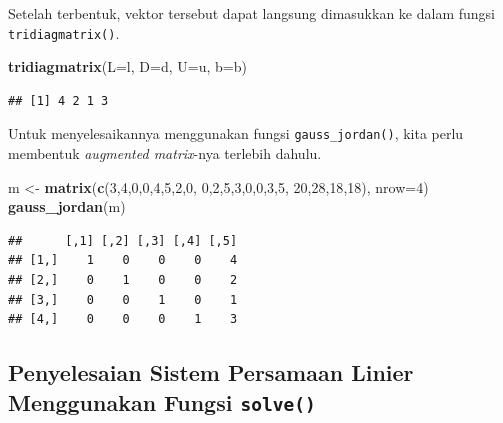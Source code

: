 \documentclass[
]{book}
\newenvironment{Shaded}{\begin{snugshade}}{\end{snugshade}}
\newcommand{\AttributeTok}[1]{\textcolor[rgb]{0.13,0.29,0.53}{#1}}
\newcommand{\DecValTok}[1]{\textcolor[rgb]{0.00,0.00,0.81}{#1}}
\newcommand{\FunctionTok}[1]{\textcolor[rgb]{0.13,0.29,0.53}{\textbf{#1}}}
\newcommand{\NormalTok}[1]{#1}
\newcommand{\OtherTok}[1]{\textcolor[rgb]{0.56,0.35,0.01}{#1}}
\theoremstyle{definition}
\theoremstyle{definition}
\theoremstyle{definition}
\theoremstyle{definition}
\theoremstyle{remark}
\begin{document}
Setelah terbentuk, vektor tersebut dapat langsung dimasukkan ke dalam fungsi \texttt{tridiagmatrix()}.

\begin{Shaded}
\begin{Highlighting}[]
\FunctionTok{tridiagmatrix}\NormalTok{(}\AttributeTok{L=}\NormalTok{l, }\AttributeTok{D=}\NormalTok{d, }\AttributeTok{U=}\NormalTok{u, }\AttributeTok{b=}\NormalTok{b)}
\end{Highlighting}
\end{Shaded}

\begin{verbatim}
## [1] 4 2 1 3
\end{verbatim}

Untuk menyelesaikannya menggunakan fungsi \texttt{gauss\_jordan()}, kita perlu membentuk \emph{augmented matrix}-nya terlebih dahulu.

\begin{Shaded}
\begin{Highlighting}[]
\NormalTok{m }\OtherTok{\textless{}{-}} \FunctionTok{matrix}\NormalTok{(}\FunctionTok{c}\NormalTok{(}\DecValTok{3}\NormalTok{,}\DecValTok{4}\NormalTok{,}\DecValTok{0}\NormalTok{,}\DecValTok{0}\NormalTok{,}\DecValTok{4}\NormalTok{,}\DecValTok{5}\NormalTok{,}\DecValTok{2}\NormalTok{,}\DecValTok{0}\NormalTok{,}
              \DecValTok{0}\NormalTok{,}\DecValTok{2}\NormalTok{,}\DecValTok{5}\NormalTok{,}\DecValTok{3}\NormalTok{,}\DecValTok{0}\NormalTok{,}\DecValTok{0}\NormalTok{,}\DecValTok{3}\NormalTok{,}\DecValTok{5}\NormalTok{,}
              \DecValTok{20}\NormalTok{,}\DecValTok{28}\NormalTok{,}\DecValTok{18}\NormalTok{,}\DecValTok{18}\NormalTok{), }\AttributeTok{nrow=}\DecValTok{4}\NormalTok{)}
\FunctionTok{gauss\_jordan}\NormalTok{(m)}
\end{Highlighting}
\end{Shaded}

\begin{verbatim}
##      [,1] [,2] [,3] [,4] [,5]
## [1,]    1    0    0    0    4
## [2,]    0    1    0    0    2
## [3,]    0    0    1    0    1
## [4,]    0    0    0    1    3
\end{verbatim}

\hypertarget{solvefunc}{%
\subsection{\texorpdfstring{Penyelesaian Sistem Persamaan Linier Menggunakan Fungsi \texttt{solve()}}{Penyelesaian Sistem Persamaan Linier Menggunakan Fungsi solve()}}\label{solvefunc}}
\end{document}
